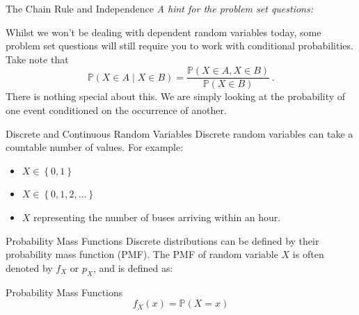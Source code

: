 \documentclass[10pt]{beamer}
\begin{document}
\begin{frame}[fragile]{The Chain Rule and Independence}
\textit{A hint for the problem set questions:}

Whilst we won't be dealing with dependent random variables today, some problem set questions will still require you to work with conditional probabilities. Take note that
\begin{equation*}
    \mathbb{P}\left(X \in A \mid X \in B\right) = \frac{\mathbb{P}\left(X \in A, X \in B\right)}{\mathbb{P}\left(X \in B\right)}\,.
\end{equation*}
There is nothing special about this. We are simply looking at the probability of one event conditioned on the occurrence of another.
\end{frame}

\begin{frame}[fragile]{Discrete and Continuous Random Variables}
Discrete random variables can take a countable number of values. For example:
\begin{itemize}
    \item \(X \in \left\{0, 1\right\}\)
    \item \(X \in \left\{0, 1, 2, \dots\right\}\)
    \item \(X\) representing the number of buses arriving within an hour.
\end{itemize}

\end{frame}

\begin{frame}[fragile]{Probability Mass Functions}
Discrete distributions can be defined by their probability mass function (PMF). The PMF of random variable \(X\) is often denoted by \(f_X\) or \(p_X\), and is defined as:
\begin{alertblock}{Probability Mass Functions}
\begin{equation*}
    f_X\left(x\right) = \mathbb{P}\left(X = x\right)
\end{equation*}
\end{alertblock}
\end{frame}
\end{document}
